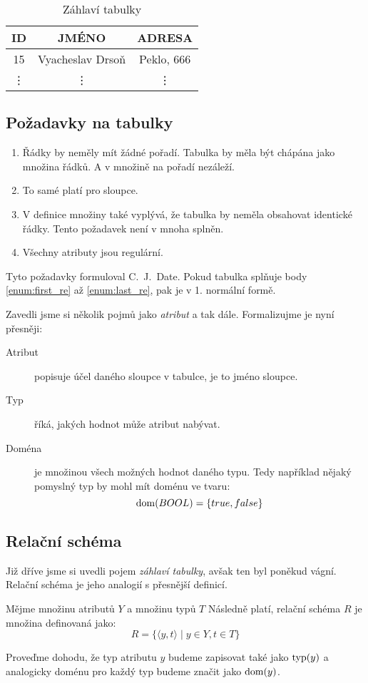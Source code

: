 \begin{table}
\caption{Záhlaví tabulky}\label{tab:zahlavi}
\begin{center}
\begin{tabular}{|c|c|c|}
\hline
ID & JMÉNO & ADRESA \\
\hline
15 & Vyacheslav Drsoň & Peklo, 666 \\
\hline
\vdots & \vdots & \vdots \\
\hline
\end{tabular}
\end{center}
\end{table}

\subsection{Požadavky na tabulky}
\begin{enumerate}
\item\label{enum:first_re} Řádky by neměly mít žádné pořadí. Tabulka by měla být chápána jako množina řádků. A v množině na pořadí nezáleží.
\item To samé platí pro sloupce.
\item V definice množiny také vyplývá, že tabulka by neměla obsahovat identické řádky. Tento požadavek není v mnoha  splněn.
\item\label{enum:last_re} Všechny atributy jsou regulární.
\end{enumerate}
Tyto požadavky formuloval C.~J.~Date.
Pokud tabulka splňuje body \ref{enum:first_re} až \ref{enum:last_re}, pak je v 1. normální formě.

Zavedli jsme si několik pojmů jako \textit{atribut} a tak dále. Formalizujme je nyní přesněji:
\begin{description}
\item[Atribut] popisuje účel daného sloupce v tabulce, je to jméno sloupce.
\item[Typ] říká, jakých hodnot může atribut nabývat.
\item[Doména] je množinou všech možných hodnot daného typu. Tedy například nějaký pomyslný typ  by mohl mít doménu ve tvaru: $$
\operatorname{dom}(BOOL) = \lbrace true, false \rbrace
$$
\end{description}

\subsection{Relační schéma}
Již dříve jsme si uvedli pojem \textit{záhlaví tabulky}, avšak ten byl poněkud vágní. Relační schéma je jeho analogií s přesnější definicí.
\begin{uptheorem}
Mějme množinu atributů $Y$ a množinu typů $T$ Následně platí, relační schéma $R$ je množina definovaná jako:
$$
R = \lbrace \langle y, t \rangle \; | \; y \in Y, t \in T \rbrace
$$
\end{uptheorem}
Proveďme dohodu, že typ atributu $y$ budeme zapisovat také jako $\operatorname{typ}(y)$ a analogicky doménu pro každý typ budeme značit jako $\operatorname{dom}(y)$.

